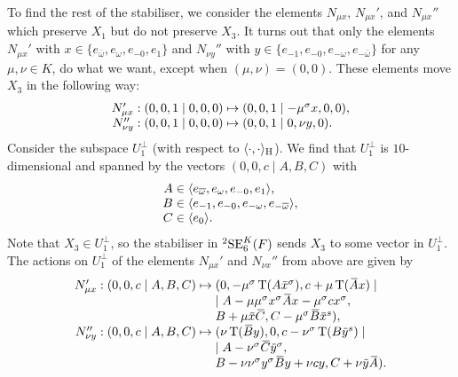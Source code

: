 To find the rest of the stabiliser, we consider the elements $N_{\mu x}$, $N_{\mu x}'$, and
$N_{\mu x}''$ which preserve $X_1$ but do not preserve $X_3$. It turns out that only the elements
$N_{\mu x}'$ with $x \in \{e_{\bar{\omega}}, e_{\omega}, e_{-0}, e_1\}$ and 
$N_{\nu y}''$ with $y \in \{ e_{-1}, e_{-0}, e_{-\omega}, e_{-\bar{\omega}} \}$ for any 
$\mu,\nu \in K$,
do what we want, except when $(\mu,\nu) = (0,0)$. These elements move $X_3$ in the following way:
\begin{equation}
	\begin{array}{r@{\;}c@{\;}l}
		N_{\mu x}': (0,0,1\mid 0,0,0) & \mapsto & (0,0,1\mid -\mu^{\s} x, 0, 0), \\
		N_{\nu y}'': (0,0,1\mid 0,0,0) & \mapsto & (0,0,1\mid 0, \nu y, 0).  
	\end{array}
\end{equation}
Consider the subspace $U_1^{\perp}$ (with respect to $\langle \cdot, \cdot \rangle_{\mathrm{H}}$). We find that
$U_1^{\perp}$ is $10$-dimensional and spanned by the vectors $(0,0,c\mid A,B,C)$ with
\begin{equation}
	\begin{array}{r@{\;}c@{\;}l}
		A & \in & \langle e_{\bar{\omega}}, e_{\omega}, e_{-0}, e_1 \rangle, \\
		B & \in & \langle e_{-1}, e_{-0}, e_{-\omega}, e_{-\bar{\omega}} \rangle, \\
		C & \in & \langle e_0 \rangle.
	\end{array}
\end{equation}
Note that $X_3 \in U_1^{\perp}$, so the stabiliser in ${}^2\mathrm{SE}_6^K(F)$ sends $X_3$ to some vector
in $U_1^{\perp}$. 
The actions on $U_1^{\perp}$ of the elements $N_{\mu x}'$ and $N_{\nu x}''$ from above are given
by
\begin{equation}
	\begin{array}{r@{\;}c@{\;}l}
		N_{\mu x}' : (0,0,c\mid A,B,C) & \mapsto & 
			(0,-\mu^{\s}\Tr(A\ovx^{\s}), c+\mu\Tr(\ovA x) \mid \\
		& & \mid A - \mu\mu^{\s} x^{\s} \ovA x - \mu^{\s} c x^{\s}, \\
		& &		 B + \mu\ovx\ovC, C - \mu^{\s} \ovB \ovx^{s}), \\
				 
		N_{\nu y}'' : (0,0,c\mid A,B,C) & \mapsto & 
			(\nu\Tr(\ovB y), 0, c-\nu^{\s}\Tr(B\ovy^{s}) \mid \\
		& & \mid A - \nu^{\s}\ovC\ovy^{\s}, \\
		& & B - \nu\nu^{\s} y^{\s}\ovB y + \nu c y, C + \nu\ovy\ovA). 
	\end{array}
\end{equation}
